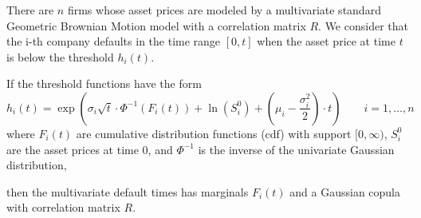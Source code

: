 \documentclass[11pt,fleqn]{book} %
\begin{document}
\begin{proposition}
	There are $n$ firms whose asset prices are modeled by a multivariate 
	standard Geometric Brownian Motion model with a	correlation matrix $R$. 
	We consider that the i-th company defaults in the time range $[0,t]$ when 
	the asset price at time $t$ is below the threshold $h_i(t)$.
	
	If the threshold functions have the form
	\begin{displaymath}
		h_i(t) = \exp\left(\sigma_i\sqrt{t}\cdot\Phi^{-1}(F_i(t)) + 
		\ln(S_i^0) + \left(\mu_i-\frac{\sigma_i^2}{2}\right)\cdot t\right)
		\qquad i=1,\dots,n
	\end{displaymath}
	where $F_i(t)$ are cumulative distribution functions (cdf) with support
	$[0,\infty)$, $S_i^0$ are the asset prices at time $0$, and $\Phi^{-1}$ is 
	the inverse of the univariate Gaussian distribution,
	
	then the multivariate default times has marginals $F_i(t)$
	and a Gaussian copula with correlation matrix $R$.
\end{proposition}
\end{document}
